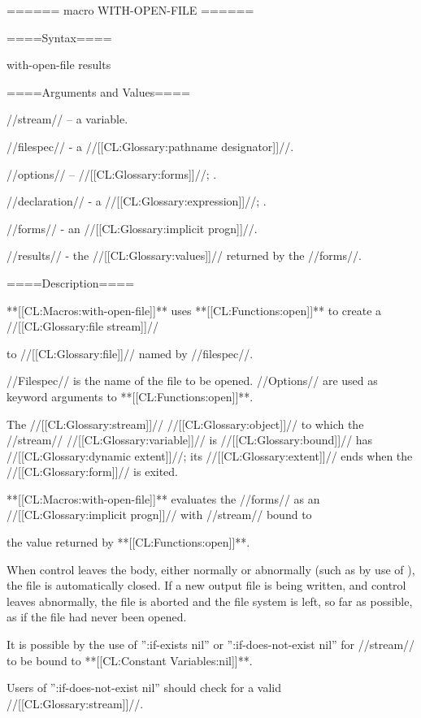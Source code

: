 ====== macro WITH-OPEN-FILE ======

====Syntax====

\DefmacWithValuesNewline with-open-file {  } {results}

====Arguments and Values====

//stream// -- a variable.

//filespec// - a //[[CL:Glossary:pathname designator]]//.

//options// -- //[[CL:Glossary:forms]]//; \eval.

//declaration// - a  //[[CL:Glossary:expression]]//; \noeval.

//forms// - an //[[CL:Glossary:implicit progn]]//.

//results// - the //[[CL:Glossary:values]]// returned by the //forms//.

====Description====

**[[CL:Macros:with-open-file]]** uses **[[CL:Functions:open]]** to create a //[[CL:Glossary:file stream]]//

to //[[CL:Glossary:file]]// named by //filespec//.

//Filespec// is the name of the file to be opened. //Options// are used as keyword arguments to **[[CL:Functions:open]]**.

The //[[CL:Glossary:stream]]// //[[CL:Glossary:object]]// to which the //stream// //[[CL:Glossary:variable]]// is //[[CL:Glossary:bound]]// has //[[CL:Glossary:dynamic extent]]//; its //[[CL:Glossary:extent]]// ends when the //[[CL:Glossary:form]]// is exited.

**[[CL:Macros:with-open-file]]** evaluates the //forms// as an //[[CL:Glossary:implicit progn]]// with //stream// bound to

the value returned by **[[CL:Functions:open]]**.

When control leaves the body, either normally or abnormally (such as by use of ), the file is automatically closed. If a new output file is being written, and control leaves abnormally, the file is aborted and the file system is left, so far as possible, as if the file had never been opened.

It is possible by the use of '':if-exists nil'' or '':if-does-not-exist nil'' for //stream// to be bound to **[[CL:Constant Variables:nil]]**.

Users of '':if-does-not-exist nil'' should check for a valid //[[CL:Glossary:stream]]//.

